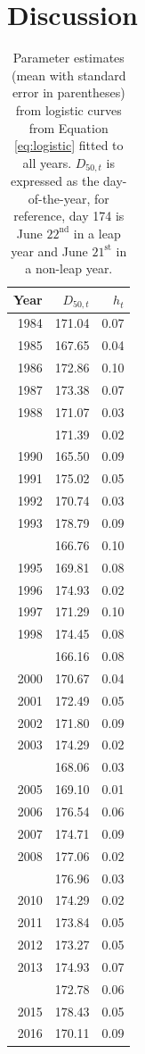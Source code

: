 \documentclass[12pt,]{book}
\theoremstyle{definition}
\theoremstyle{definition}
\theoremstyle{definition}
\theoremstyle{remark}
\begin{document}
\section{Discussion}\label{discussion}

\begin{singlespace}

\begin{table}

\caption{\label{tab:rt-ests-table}Parameter estimates (mean with standard error in parentheses) from logistic curves from Equation \ref{eq:logistic} fitted to all years. $D_{50,t}$ is expressed as the day-of-the-year, for reference, day 174 is June $22^{\text{nd}}$ in a leap year and June $21^{\text{st}}$ in a non-leap year.}
\centering
\begin{tabular}[t]{rrr}
\toprule
Year & $D_{50,t}$ & $h_t$\\
\midrule
1984 & 171.04 & 0.07\\
1985 & 167.65 & 0.04\\
1986 & 172.86 & 0.10\\
1987 & 173.38 & 0.07\\
1988 & 171.07 & 0.03\\
\addlinespace
1989 & 171.39 & 0.02\\
1990 & 165.50 & 0.09\\
1991 & 175.02 & 0.05\\
1992 & 170.74 & 0.03\\
1993 & 178.79 & 0.09\\
\addlinespace
1994 & 166.76 & 0.10\\
1995 & 169.81 & 0.08\\
1996 & 174.93 & 0.02\\
1997 & 171.29 & 0.10\\
1998 & 174.45 & 0.08\\
\addlinespace
1999 & 166.16 & 0.08\\
2000 & 170.67 & 0.04\\
2001 & 172.49 & 0.05\\
2002 & 171.80 & 0.09\\
2003 & 174.29 & 0.02\\
\addlinespace
2004 & 168.06 & 0.03\\
2005 & 169.10 & 0.01\\
2006 & 176.54 & 0.06\\
2007 & 174.71 & 0.09\\
2008 & 177.06 & 0.02\\
\addlinespace
2009 & 176.96 & 0.03\\
2010 & 174.29 & 0.02\\
2011 & 173.84 & 0.05\\
2012 & 173.27 & 0.05\\
2013 & 174.93 & 0.07\\
\addlinespace
2014 & 172.78 & 0.06\\
2015 & 178.43 & 0.05\\
2016 & 170.11 & 0.09\\
\bottomrule
\end{tabular}
\end{table}

\end{singlespace}
\end{document}
